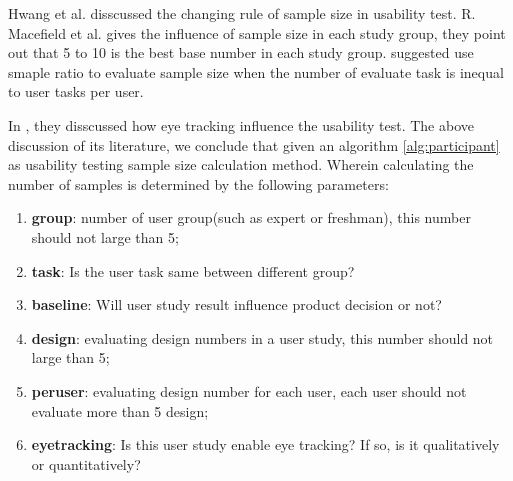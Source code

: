 Hwang et al.\cite{Hwang:2010:NPR:1735223.1735255} disscussed the changing rule of sample size in usability test. R. Macefield et al.\cite{Macefield:2009:SPG:2835425.2835429} gives the influence of sample size in each study group, they point out that 5 to 10 is the best base number in each study group.
\cite{medlock2002using} suggested use smaple ratio to evaluate sample size when the number of evaluate task is inequal to user tasks per user.

In \cite{pernice2009eyetracking}, they disscussed how eye tracking influence the usability test. The above discussion of its literature, we conclude that given an algorithm \ref{alg:participant} as usability testing sample size calculation method. Wherein calculating the number of samples is determined by the following parameters:
\begin{enumerate}
    \kaishu
    \item \textbf{group}: number of user group(such as expert or freshman), this number should not large than 5;
    \item \textbf{task}: Is the user task same between different group?
    \item \textbf{baseline}: Will user study result influence product decision or not?
    \item \textbf{design}: evaluating design numbers in a user study, this number should not large than 5;
    \item \textbf{peruser}: evaluating design number for each user, each user should not evaluate more than 5 design;
    \item \textbf{eyetracking}: Is this user study enable eye tracking? If so, is it qualitatively or quantitatively?
\end{enumerate}

